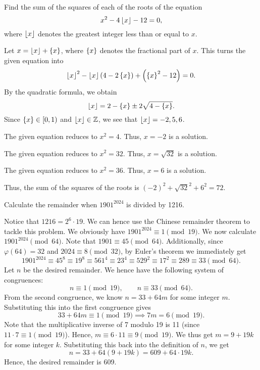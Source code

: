 \begin{question}[72]\label{A::2024-S-1-19}
    Find the sum of the squares of each of the roots of the equation \[x^2 - 4\left\lfloor x \right\rfloor - 12 = 0,\] where $\left\lfloor x \right\rfloor$ denotes the greatest integer less than or equal to $x$.
\end{question}
\begin{solution*}
    Let $x = \left\lfloor x \right\rfloor + \left\lbrace x \right\rbrace$, where $\left\lbrace x \right\rbrace$ denotes the fractional part of $x$. This turns the given equation into \[\left\lfloor x \right\rfloor^2 - \left\lfloor x \right\rfloor\left( 4 - 2\left\lbrace x \right\rbrace \right) + \left( \left\lbrace x \right\rbrace^2 - 12 \right) = 0.\] By the quadratic formula, we obtain \[\left\lfloor x \right\rfloor = 2 - \left\lbrace x \right\rbrace \pm 2\sqrt{4 - \left\lbrace x \right\rbrace}.\] Since $\left\lbrace x \right\rbrace \in [0, 1)$ and $\left\lfloor x \right\rfloor \in \mathbb{Z}$, we see that $\left\lfloor x \right\rfloor = -2, 5, 6$.

     The given equation reduces to $x^2 = 4$. Thus, $x = -2$ is a solution.

     The given equation reduces to $x^2 = 32$. Thus, $x = \sqrt{32}$ is a solution.

     The given equation reduces to $x^2 = 36$. Thus, $x = 6$ is a solution.

    Thus, the sum of the squares of the roots is $(-2)^2 + \sqrt{32}^2 + 6^2 = 72$.
\end{solution*}

\begin{question}[609]\label{A::2024-S-1-20}
    Calculate the remainder when $1901^{2024}$ is divided by 1216.
\end{question}
\begin{solution*}
    Notice that $1216 = 2^6 \cdot 19$. We can hence use the Chinese remainder theorem to tackle this problem. We obviously have $1901^{2024} \equiv 1 \pmod{19}$. We now calculate $1901^{2024} \pmod{64}$. Note that $1901 \equiv 45 \pmod{64}$. Additionally, since $\varphi(64) = 32$ and $2024 \equiv 8 \pmod{32}$, by Euler's theorem we immediately get \[1901^{2024} \equiv 45^8 \equiv 19^8 \equiv 561^4 \equiv 23^4 \equiv 529^2 \equiv 17^2 \equiv 289 \equiv 33  \pmod{64}.\] Let $n$ be the desired remainder. We hence have the following system of congruences: \[n \equiv 1 \pmod{19}, \qquad n \equiv 33 \pmod{64}.\] From the second congruence, we know $n = 33 + 64m$ for some integer $m$. Substituting this into the first congruence gives \[33 + 64m \equiv 1 \pmod{19} \implies 7m = 6 \pmod{19}.\] Note that the multiplicative inverse of 7 modulo 19 is 11 (since $11 \cdot 7 \equiv 1 \pmod{19}$). Hence, $m \equiv 6 \cdot 11 \equiv 9 \pmod{19}$. We thus get $m = 9 + 19k$ for some integer $k$. Substituting this back into the definition of $n$, we get \[n = 33 + 64(9 + 19k) = 609 + 64 \cdot 19k.\] Hence, the desired remainder is 609.
\end{solution*}

